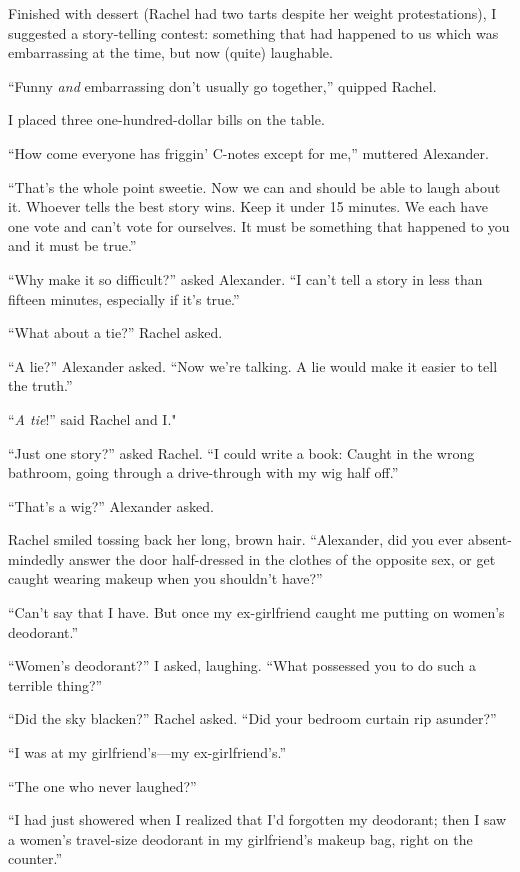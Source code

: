 Finished with dessert (Rachel had two tarts despite her weight
protestations), I suggested a story-telling contest: something that had
happened to us which was embarrassing at the time, but now (quite)
laughable.

``Funny \emph{and} embarrassing don't usually go together,'' quipped
Rachel.

I placed three one-hundred-dollar bills on the table.

``How come everyone has friggin' C-notes except for me,'' muttered
Alexander.

``That's the whole point sweetie. Now we can and should be able to laugh
about it. Whoever tells the best story wins. Keep it under 15 minutes.
We each have one vote and can't vote for ourselves. It must be something
that happened to you and it must be true.''

``Why make it so difficult?'' asked Alexander. ``I can't tell a story in
less than fifteen minutes, especially if it's true.''

``What about a tie?'' Rachel asked.

``A lie?'' Alexander asked. ``Now we're talking. A lie would make it
easier to tell the truth.''

``\emph{A tie}!'' said Rachel and I."

``Just one story?'' asked Rachel. ``I could write a book: Caught in the
wrong bathroom, going through a drive-through with my wig half off.''

``That's a wig?'' Alexander asked.

Rachel smiled tossing back her long, brown hair. ``Alexander, did you
ever absent-mindedly answer the door half-dressed in the clothes of the
opposite sex, or get caught wearing makeup when you shouldn't have?''

``Can't say that I have. But once my ex-girlfriend caught me putting on
women's deodorant.''

``Women's deodorant?'' I asked, laughing. ``What possessed you to do
such a terrible thing?''

``Did the sky blacken?'' Rachel asked. ``Did your bedroom curtain rip
asunder?''

``I was at my girlfriend's---my ex-girlfriend's.''

``The one who never laughed?''

``I had just showered when I realized that I'd forgotten my deodorant;
then I saw a women's travel-size deodorant in my girlfriend's makeup
bag, right on the counter.''

